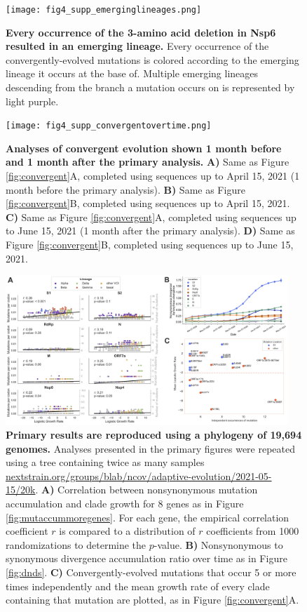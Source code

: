 \documentclass[11pt,oneside,letterpaper]{article}
\begin{document}
\begin{figure}[h!]
\centerline{\texttt{[image: fig4\_supp\_emerginglineages.png]}}
\caption{\textbf{Every occurrence of the 3-amino acid deletion in Nsp6 resulted in an emerging lineage.}
Every occurrence of the convergently-evolved mutations is colored according to the emerging lineage it occurs at the base of. Multiple emerging lineages descending from the branch a mutation occurs on is represented by light purple.
}
\label{fig:emerginglineages}
\end{figure}

\begin{figure}[h!]
\centerline{\texttt{[image: fig4\_supp\_convergentovertime.png]}}
\caption{\textbf{Analyses of convergent evolution shown 1 month before and 1 month after the primary analysis.}
\textbf{A)} Same as Figure \ref{fig:convergent}A, completed using sequences up to April 15, 2021 (1 month before the primary analysis). \textbf{B)} Same as Figure \ref{fig:convergent}B, completed using sequences up to April 15, 2021. \textbf{C)} Same as Figure \ref{fig:convergent}A, completed using sequences up to June 15, 2021 (1 month after the primary analysis). \textbf{D)} Same as Figure \ref{fig:convergent}B, completed using sequences up to June 15, 2021.
}
\label{fig:convergentovertime}
\end{figure}

\begin{figure}[h!]
\centerline{\includegraphics[width=0.95\textwidth]{disc_supp_20k.png}}
\caption{\textbf{Primary results are reproduced using a phylogeny of 19,694 genomes.}
Analyses presented in the primary figures were repeated using a tree containing twice as many samples \href{https://nextstrain.org/groups/blab/ncov/adaptive-evolution/2021-05-15/20k}{nextstrain.org/groups/blab/ncov/adaptive-evolution/2021-05-15/20k}.
\textbf{A)} Correlation between nonsynonymous mutation accumulation and clade growth for 8 genes as in Figure \ref{fig:mutaccummoregenes}. For each gene, the empirical correlation coefficient $r$ is compared to a distribution of $r$ coefficients from 1000 randomizations to determine the $p$-value. \textbf{B)} Nonsynonymous to synonymous divergence accumulation ratio over time as in Figure \ref{fig:dnds}. \textbf{C)} Convergently-evolved mutations that occur 5 or more times independently and the mean growth rate of every clade containing that mutation are plotted, as in Figure \ref{fig:convergent}A.
}
\label{fig:20tree}
\end{figure}
\end{document}

